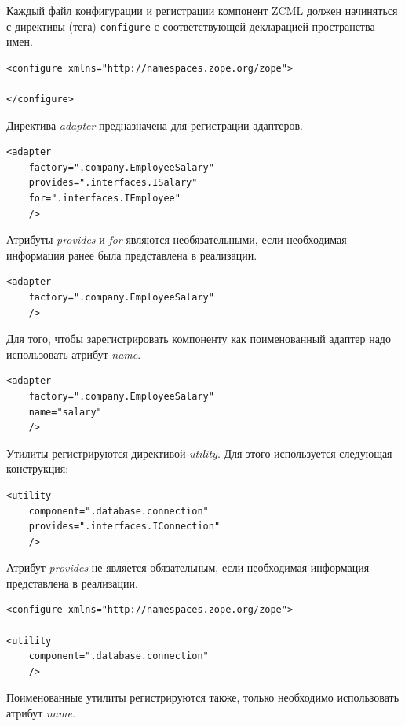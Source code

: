 \documentclass[a4paper,openany,twoside,draft]{book}
\providecommand*{\DUroletitlereference}[1]{\textsl{#1}}
\begin{document}
Каждый файл конфигурации и регистрации компонент ZCML должен начиняться с директивы (тега) \texttt{configure} с соответствующей декларацией пространства имен.

\begin{verbatim}
<configure xmlns="http://namespaces.zope.org/zope">

</configure>
\end{verbatim}

Директива \DUroletitlereference{adapter} предназначена для регистрации адаптеров.

\begin{verbatim}
<adapter
    factory=".company.EmployeeSalary"
    provides=".interfaces.ISalary"
    for=".interfaces.IEmployee"
    />
\end{verbatim}

Атрибуты \DUroletitlereference{provides} и \DUroletitlereference{for} являются необязательными, если необходимая информация ранее была представлена в реализации.

\begin{verbatim}
<adapter
    factory=".company.EmployeeSalary"
    />
\end{verbatim}

Для того, чтобы зарегистрировать компоненту как поименованный адаптер надо использовать атрибут \DUroletitlereference{name}.

\begin{verbatim}
<adapter
    factory=".company.EmployeeSalary"
    name="salary"
    />
\end{verbatim}

Утилиты регистрируются директивой \DUroletitlereference{utility}.  Для этого используется следующая конструкция:

\begin{verbatim}
<utility
    component=".database.connection"
    provides=".interfaces.IConnection"
    />
\end{verbatim}

Атрибут \DUroletitlereference{provides} не является обязательным, если необходимая информация представлена в реализации.

\begin{verbatim}
<configure xmlns="http://namespaces.zope.org/zope">

<utility
    component=".database.connection"
    />
\end{verbatim}

Поименованные утилиты регистрируются также, только необходимо использовать атрибут \DUroletitlereference{name}.
\end{document}
